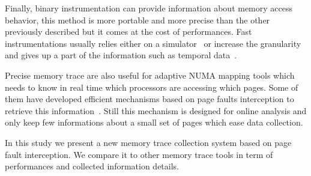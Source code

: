 Finally, binary instrumentation can provide information about memory access
behavior, this method is more portable and  more precise than the other
previously described but it comes at the cost of performances. Fast
instrumentations usually relies either on a simulator~\cite{DeRose02SIGMA} or
increase the granularity and gives up a part of the information such as
temporal data~\cite{Beniamine15TABARNACRR}.

Precise memory trace are also useful for adaptive NUMA mapping tools which
needs to know in real time which processors are accessing which pages. Some of
them have developed efficient mechanisms based on page faults interception to
retrieve this information~\cite{Diener13CommunicationBased}. Still this
mechanism is designed for online analysis and only keep few informations about
a small set of pages which ease data collection.

In this study we present a new memory trace collection system based on page
fault interception. We compare it to other memory trace tools in term of
performances and collected information details.
